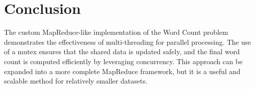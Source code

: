 \documentclass[12pt]{article}
\begin{document}
\section{Conclusion}
The custom MapReduce-like implementation of the Word Count problem demonstrates the effectiveness of multi-threading for parallel processing. The use of a mutex ensures that the shared data is updated safely, and the final word count is computed efficiently by leveraging concurrency. This approach can be expanded into a more complete MapReduce framework, but it is a useful and scalable method for relatively smaller datasets.
\end{document}
